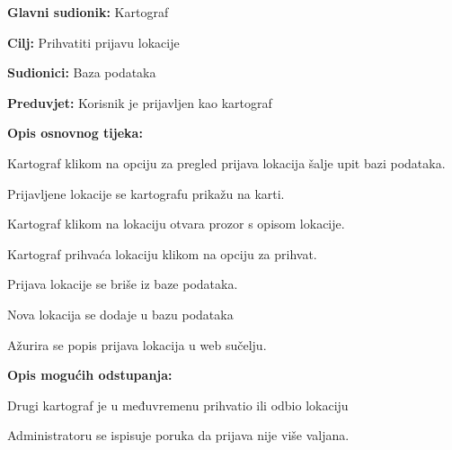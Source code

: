 				\noindent {}
				\begin{packed_item}
					
					\item \textbf{Glavni sudionik: }Kartograf
					\item  \textbf{Cilj:} Prihvatiti prijavu lokacije
					\item  \textbf{Sudionici:} Baza podataka
					\item  \textbf{Preduvjet:} Korisnik je prijavljen kao kartograf
					\item  \textbf{Opis osnovnog tijeka:}
					
					\item[] \begin{packed_enum}
						
						\item Kartograf klikom na opciju za pregled prijava lokacija šalje upit bazi podataka.
						\item Prijavljene lokacije se kartografu prikažu na karti.
						\item Kartograf klikom na lokaciju otvara prozor s opisom lokacije.
						\item Kartograf prihvaća lokaciju klikom na opciju za prihvat.
						\item Prijava lokacije se briše iz baze podataka.
						\item Nova lokacija se dodaje u bazu podataka
						\item Ažurira se popis prijava lokacija u web sučelju.
					\end{packed_enum}
					
					\item  \textbf{Opis mogućih odstupanja:}
					
					\item[] \begin{packed_item}
						
						\item[3.a] Drugi kartograf je u međuvremenu prihvatio ili odbio lokaciju
						\item[] \begin{packed_enum}
							
							\item Administratoru se ispisuje poruka da prijava nije više valjana.
							
						\end{packed_enum}
						
					\end{packed_item}
				\end{packed_item}
				
